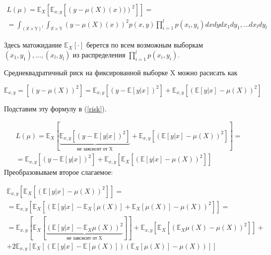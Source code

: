 \documentclass{article}
\theoremstyle{definition}
\theoremstyle{theorem}
\theoremstyle{remark}
\theoremstyle{theorem}
\theoremstyle{example}
\theoremstyle{theorem}
\theoremstyle{theorem}
\theoremstyle{theorem}
\theoremstyle{theorem}
\begin{document}
\begin{multline}
	L(\mu) = \mathbb{E}_X\left[\mathbb{E}_{x,y}\left[ \left(y-\mu(X)(x))\right)^2\right]\right] =  \\ =\int_{(\mathbb{X}\times\mathbb{Y})^l}\int_{\mathbb{X}\times\mathbb{Y}} \left(y-\mu(X)(x)\right)^2 p(x,y)\prod^l_{i=1}p(x_i,y_i)dxdydx_1dy_1,\ldots dx_ldy_l
	\label{risk}
\end{multline}

Здесь матожидание $\mathbb{E}_X[\cdot]$ берется по всем возможным выборкам ${(x_1, y_1), . . . ,(x_l, y_l)}$
из распределения $\prod_{i=1}^{l}p(x_i,y_i)$.

Среднеквадратичный риск на фиксированной выборке X можно расисать как

$\mathbb{E}_{x,y} = \left[(y-\mu(X))^2\right] = \mathbb{E}_{x,y}\left[(y-\mathbb{E}[y|x])^2\right] + \mathbb{E}_{x,y}\left[(\mathbb{E}[y|x] - \mu(X))^2\right]$

Подставим эту формулу в (\ref{risk}).

\begin{equation}
	\begin{split}
	L(\mu) = \mathbb{E}_X\left[\underbrace{\mathbb{E}_{x,y}\left[(y-\mathbb{E}[y|x])^2\right]}_{\text{не завсисит от X}} + \mathbb{E}_{x,y}\left[(\mathbb{E}[y|x] - \mu(X))^2\right]\right] = \\
	= \mathbb{E}_{x,y}\left[(y-\mathbb{E}[y|x])^2\right] + \mathbb{E}_{x,y}\left[\mathbb{E}_X \left[(\mathbb{E}[y|x]- \mu(X))^2\right]\right]
\end{split}
\label{2.2}
\end{equation}
Преобразовываем второе слагаемое:


\begin{multline}
	\mathbb{E}_{x,y}\left[\mathbb{E}_X \left[(\mathbb{E}[y|x] - \mu(X))^2\right]\right] = \\ = \mathbb{E}_{x,y}\left[\mathbb{E}_X \left[(\mathbb{E}[y|x] - \mathbb{E}_X[\mu(X)] + \mathbb{E}_X[\mu(X)] -\mu(X))^2\right]\right] = \\ =
	\mathbb{E}_{x,y}\left[\mathbb{E}_X \left[\underbrace{(\mathbb{E}[y|x] - \mathbb{E}_X \mu(X))^2}_{\text{не завсисит от X}}\right]\right] + \mathbb{E}_{x,y}\left[\mathbb{E}_X \left[(\mathbb{E}_X \mu(X) - \mu(X))^2\right]\right] + \\ + 
	2\mathbb{E}_{x,y} \left[\mathbb{E}_X\left[(\mathbb{E}[y|x] - \mathbb{E}[\mu(X)])(\mathbb{E}_X[\mu(X)]-\mu(X))\right]\right]
	\label{2.3}
\end{multline}
\end{document}
